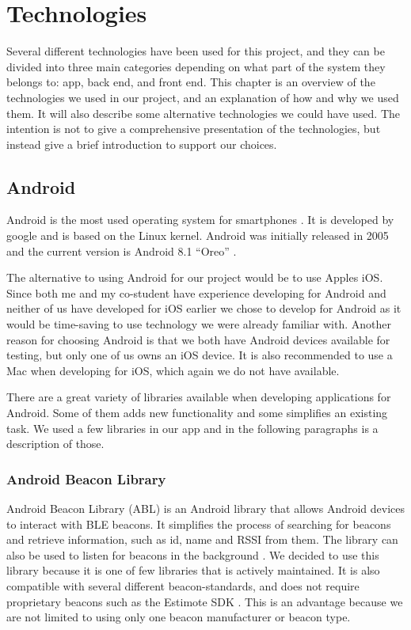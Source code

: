 \documentclass[../Main/thesis.tex]{subfiles}
\begin{document}
\chapter{Technologies}
\label{ch:technologies}

Several different technologies have been used for this project, and they can be divided into three main categories depending on what part of the system they belongs to: app, back end, and front end.
This chapter is an overview of the technologies we used in our project, and an explanation of how and why we used them.
It will also describe some alternative technologies we could have used.
The intention is not to give a comprehensive presentation of the technologies, but instead give a brief introduction to support our choices.

\section{Android}
Android is the most used operating system for smartphones \citep{osmarketshare}. 
It is developed by google and is based on the Linux kernel.
Android was initially released in 2005 \citep{Morrill2008a} and the current version is Android 8.1 ``Oreo'' \citep{Burke2017a}.

The alternative to using Android for our project would be to use Apples iOS.
Since both me and my co-student have experience developing for Android and neither of us have developed for iOS earlier we chose to develop for Android as it would be time-saving to use technology we were already familiar with.
Another reason for choosing Android is that we both have Android devices available for testing, but only one of us owns an iOS device.
It is also recommended to use a Mac when developing for iOS, which again we do not have available.

There are a great variety of libraries available when developing applications for Android.
Some of them adds new functionality and some simplifies an existing task.
We used a few libraries in our app and in the following paragraphs is a description of those.

\subsection{Android Beacon Library}
Android Beacon Library (ABL) is an Android library that allows Android devices to interact with BLE beacons. 
It simplifies the process of searching for beacons and retrieve information, such as id, name and RSSI from them.
The library can also be used to listen for beacons in the background \citep{RadiusNetwork2015}.
We decided to use this library because it is one of few libraries that is actively maintained.
It is also compatible with several different beacon-standards, and does not require proprietary beacons such as the Estimote SDK \citep{Estimote2017}.
This is an advantage because we are not limited to using only one beacon manufacturer or beacon type.
\end{document}
